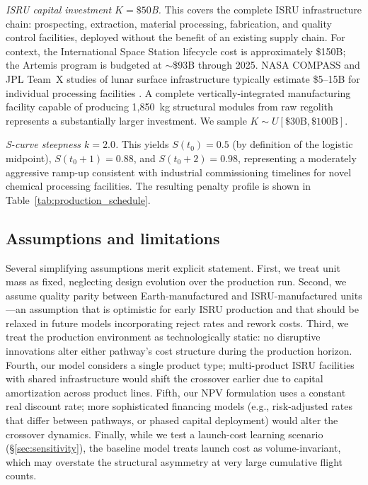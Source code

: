\documentclass[preprint,12pt]{elsarticle}
\begin{document}
\emph{ISRU capital investment $K = \$50$B.} This covers the complete ISRU infrastructure chain: prospecting, extraction, material processing, fabrication, and quality control facilities, deployed without the benefit of an existing supply chain. For context, the International Space Station lifecycle cost is approximately \$150B; the Artemis program is budgeted at $\sim$\$93B through 2025. NASA COMPASS and JPL Team~X studies of lunar surface infrastructure typically estimate \$5--15B for individual processing facilities \cite{sanders2015,nasa2015handbook}. A complete vertically-integrated manufacturing facility capable of producing 1{,}850~kg structural modules from raw regolith represents a substantially larger investment. We sample $K \sim U[\$30\text{B}, \$100\text{B}]$.

\emph{S-curve steepness $k = 2.0$.} This yields $S(t_0) = 0.5$ (by definition of the logistic midpoint), $S(t_0 + 1) = 0.88$, and $S(t_0 + 2) = 0.98$, representing a moderately aggressive ramp-up consistent with industrial commissioning timelines for novel chemical processing facilities. The resulting penalty profile is shown in Table~\ref{tab:production_schedule}.

\subsection{Assumptions and limitations}

Several simplifying assumptions merit explicit statement. First, we treat unit mass as fixed, neglecting design evolution over the production run. Second, we assume quality parity between Earth-manufactured and ISRU-manufactured units---an assumption that is optimistic for early ISRU production and that should be relaxed in future models incorporating reject rates and rework costs. Third, we treat the production environment as technologically static: no disruptive innovations alter either pathway's cost structure during the production horizon. Fourth, our model considers a single product type; multi-product ISRU facilities with shared infrastructure would shift the crossover earlier due to capital amortization across product lines. Fifth, our NPV formulation uses a constant real discount rate; more sophisticated financing models (e.g., risk-adjusted rates that differ between pathways, or phased capital deployment) would alter the crossover dynamics. Finally, while we test a launch-cost learning scenario (\S\ref{sec:sensitivity}), the baseline model treats launch cost as volume-invariant, which may overstate the structural asymmetry at very large cumulative flight counts.
\end{document}
